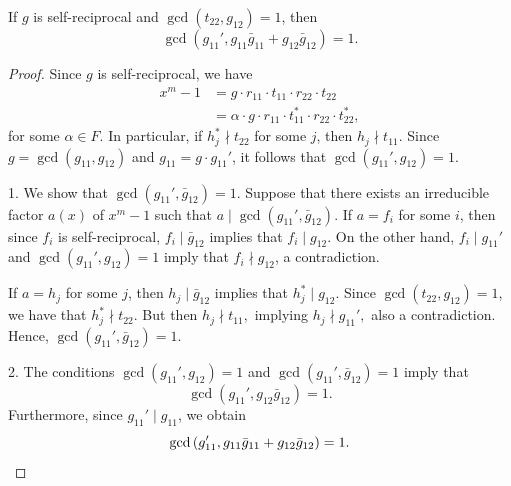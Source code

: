 \documentclass[a4paper,12pt]{article}
\begin{document}
\begin{lemma} \label{1b} If $g$ is self-reciprocal and $\gcd(t_{22},g_{12})=1$, then 
\[
\gcd \left(g_{11}',  g_{11}\bar{g}_{11}+g_{12} \bar{g}_{12}\right)=1.
\]
\end{lemma}
\begin{proof} 
Since $g$ is self-reciprocal, we have 
\begin{align*}
x^m-1 &= g \cdot  r_{11} \cdot t_{11} \cdot r_{22} \cdot t_{22} \\
    &= \alpha \cdot g \cdot r_{11} \cdot t_{11}^* \cdot r_{22} \cdot t_{22}^*,
\end{align*}
for some $\alpha \in F$. In particular, if   $h_j^* \nmid t_{22}$ for some $j$, then $h_j \nmid t_{11}$. Since $g=\gcd(g_{11},g_{12})$ and $g_{11}=g \cdot g_{11}'$, it follows that $\gcd( g_{11}', g_{12})=1$. 

1.  We  show that $\gcd( g_{11}', \bar{g}_{12})=1$.  Suppose that there exists an irreducible factor $a(x)$ of $x^m-1$ such that $a \mid \gcd( g_{11}', \bar{g}_{12})$. 
If $a=f_i$ for some $i$, then  since $f_i$ is self-reciprocal, $f_i \mid \bar{g}_{12}$ implies that  $f_i \mid g_{12}$.
On the other hand, $f_i \mid g_{11}'$ and $\gcd( g_{11}', g_{12})=1$ imply that $f_i \nmid g_{12}$, a contradiction. 

If $a=h_j$ for some $j$, then $h_j \mid \bar{g}_{12}$ implies that $h_j^* \mid g_{12}$. Since $\gcd(t_{22},g_{12})=1$, we have that $h_j^* \nmid t_{22}$. But then $h_j \nmid t_{11},$ implying  $h_j \nmid g_{11}',$ also a contradiction. Hence, $\gcd( g_{11}', \bar{g}_{12})=1$. 
 

2.    The conditions $\gcd( g_{11}', g_{12})=1$ and $\gcd( g_{11}', \bar{g}_{12})=1$ imply that
\[
\gcd( g_{11}', g_{12}\bar{g}_{12})=1.
\]
Furthermore, since $g_{11}'\mid g_{11}$, we   obtain
\[
  \gcd \left(g_{11}',  g_{11}\bar{g}_{11}+g_{12} \bar{g}_{12}\right)=1. \qedhere
\]
\end{proof}

 
\end{document}
